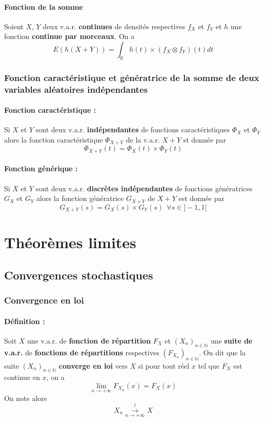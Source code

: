 \documentclass[10pt,a4paper,twoside]{article}
\begin{document}
\paragraph{Fonction de la somme} Soient $X$, $Y$ deux v.a.r. \textbf{continues} de densités respectives $f_{X}$ et $f_{Y}$ et $h$ une fonction \textbf{continue par morceaux}. On a
$$E(h(X+Y))=\int_{\mathbb{R}} h(t)\times (f_{X}\otimes f_{Y})(t) dt$$

\subsubsection{Fonction caractéristique et génératrice de la somme de deux variables aléatoires indépendantes}
\paragraph{Fonction caractéristique :} Si $X$ et $Y$ sont deux v.a.r. \textbf{indépendantes} de fonctions caractéristiques $\Phi_{X}$ et $\Phi_{Y}$ alors la fonction caractéristique $\Phi_{X+Y}$ de la v.a.r. $X+Y$ st donnée par
$$\Phi_{X+Y}(t) = \Phi_{X}(t)\times \Phi_{Y}(t)$$

\paragraph{Fonction générique :} Si $X$ et $Y$ sont deux v.a.r. \textbf{discrètes indépendantes} de fonctions génératrices $G_{X}$ et $G_{Y}$ alors la fonction génératrice $G_{X+Y}$ de $X+Y$ est donnée par
$$G_{X+Y}(s)=G_{X}(s)\times G_{Y}(s)\ \ \forall s \in ]-1,1[$$

\section{Théorèmes limites}
\subsection{Convergences stochastiques}
\subsubsection{Convergence en loi}
\paragraph{Définition :} Soit $X$ une v.a.r. de \textbf{fonction de répartition} $F_{X}$ et $(X_{n})_{n\in\mathbb{N}}$ une \textbf{suite de v.a.r.} de \textbf{fonctions de répartitions} respectives $(F_{X_{n}})_{n\in\mathbb{N}}$. On dit que la suite $(X_{n})_{n\in\mathbb{N}}$ \textbf{converge en loi} vers $X$ si pour tout réel $x$ tel que $F_{X}$ est continue en $x$, on a
$$\lim\limits_{n\rightarrow+\infty}F_{X_{n}}(x)=F_{X}(x)$$
On note alors
$$X_{n}\overset{l}{\underset{n\rightarrow+\infty}{\longrightarrow}}X$$
\end{document}
